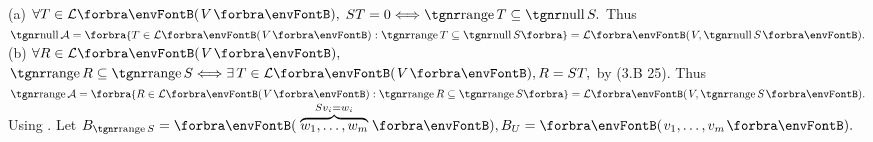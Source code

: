 (a) %
{$\forall T\in\Lm{V},$ $ST=0\Longleftrightarrow \range T\subseteq\null S.$}\parSol{\Ha}
{Thus $\null\mathcal{A}=\Bra{T\in\Lm{V}:\range T\subseteq\null S}=\Lm{V,\null S}.$}\parSol{\vspace{2pt}}
(b) %
{$\forall R\in\Lm{V},$ $\range R\subseteq\range S \Longleftrightarrow\exists\,T\in\Lm{V},R=ST,$ by (3.B 25).}\parSol{\Hb}
{Thus $\range\mathcal{A}=\Bra{R\in\Lm{V}:\range R\subseteq\range S}=\Lm{V,\range S}.$}\envFontDefault\PfEnd\vspace{14pt}\quad
\Or Using \NOTEFOR\;[3.60]. \;Let $B_{\range S}=\Par{\overbrace{w_1,\dots,w_m}^{Sv_i=w_i}},B_{U}=\Par{v_1,\dots,v_m}.$\par\vspace{-16pt}\quad
